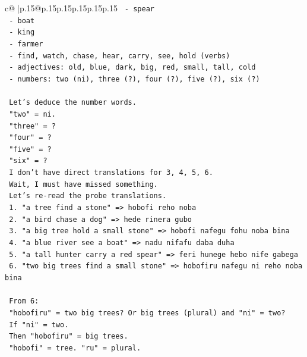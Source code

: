 \documentclass{article}
\begin{document}
{\begin{supertabular}{c@{$\;$}|p{.15\linewidth}@{}p{.15\linewidth}p{.15\linewidth}p{.15\linewidth}p{.15\linewidth}p{.15\linewidth}}
{{{\texttt{        {-} spear} \\
\texttt{        {-} boat} \\
\texttt{        {-} king} \\
\texttt{        {-} farmer} \\
\texttt{        {-} find, watch, chase, hear, carry, see, hold (verbs)} \\
\texttt{        {-} adjectives: old, blue, dark, big, red, small, tall, cold} \\
\texttt{        {-} numbers: two (ni), three (?), four (?), five (?), six (?)} \\
\\ 
\texttt{        Let's deduce the number words.} \\
\texttt{        "two" = ni.} \\
\texttt{        "three" = ?} \\
\texttt{        "four" = ?} \\
\texttt{        "five" = ?} \\
\texttt{        "six" = ?} \\
\texttt{        I don't have direct translations for 3, 4, 5, 6.} \\
\texttt{        Wait, I must have missed something.} \\
\texttt{        Let's re{-}read the probe translations.} \\
\texttt{        1. "a tree find a stone" => hobofi reho noba} \\
\texttt{        2. "a bird chase a dog" => hede rinera gubo} \\
\texttt{        3. "a big tree hold a small stone" => hobofi nafegu fohu noba bina} \\
\texttt{        4. "a blue river see a boat" => nadu nifafu daba duha} \\
\texttt{        5. "a tall hunter carry a red spear" => feri hunege hebo nife gabega} \\
\texttt{        6. "two big trees find a small stone" => hobofiru nafegu ni reho noba bina} \\
\\ 
\texttt{        From 6:} \\
\texttt{        "hobofiru" = two big trees? Or big trees (plural) and "ni" = two?} \\
\texttt{        If "ni" = two.} \\
\texttt{        Then "hobofiru" = big trees.} \\
\texttt{        "hobofi" = tree. "ru" = plural.} \\
}}}
\end{supertabular}}
\end{document}
